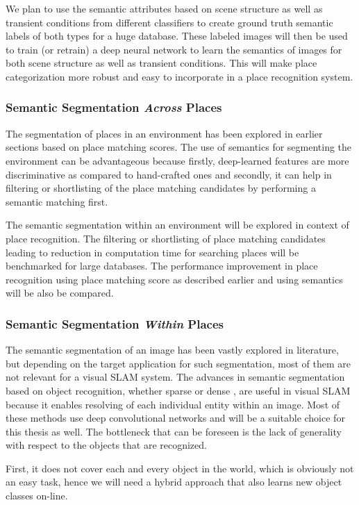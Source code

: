 \documentclass{article}
\begin{document}
We plan to use the semantic attributes based on scene structure as well as transient conditions from different classifiers to create ground truth semantic labels of both types for a huge database. These labeled images will then be used to train (or retrain) a deep neural network to learn the semantics of images for both scene structure as well as transient conditions. This will make place categorization more robust and easy to incorporate in a place recognition system.

\subsubsection{Semantic Segmentation \emph{Across} Places}
The segmentation of places in an environment has been explored in earlier sections based on place matching scores. The use of semantics for segmenting the environment can be advantageous because firstly, deep-learned features are more discriminative \cite{chen2017deep} as compared to hand-crafted ones and secondly, it can help in filtering or shortlisting of the place matching candidates by performing a semantic matching first.

The semantic segmentation within an environment will be explored in context of place recognition. The filtering or shortlisting of place matching candidates leading to reduction in computation time for searching places will be benchmarked for large databases. The performance improvement in place recognition using place matching score as described earlier and using semantics will be also be compared.

\subsubsection{Semantic Segmentation \emph{Within} Places}
The semantic segmentation of an image has been vastly explored in literature, but depending on the target application for such segmentation, most of them are not relevant for a visual SLAM system. The advances in semantic segmentation based on object recognition, whether sparse \cite{girshick2014rich} or dense \cite{long2015fully}, are useful in visual SLAM because it enables resolving of each individual entity within an image. Most of these methods use deep convolutional networks and will be a suitable choice for this thesis as well. The bottleneck that can be foreseen is the lack of generality with respect to the objects that are recognized. 

First, it does not cover each and every object in the world, which is obviously not an easy task, hence we will need a hybrid approach that also learns new object classes on-line. 
\end{document}
